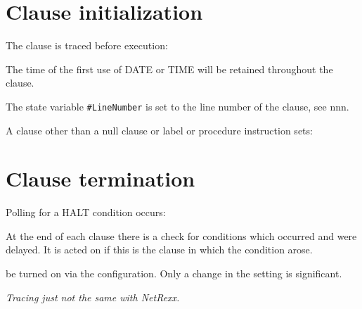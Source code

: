 

\section{Clause initialization}\label{clause-initialization}

The clause is traced before execution:



The time of the first use of DATE or TIME will be retained throughout
the clause.



The state variable \texttt{\#LineNumber} is set to the line number of
the clause, see nnn.

A clause other than a null clause or label or procedure instruction
sets:



\section{Clause termination}\label{clause-termination}



Polling for a HALT condition occurs:



At the end of each clause there is a check for conditions which occurred
and were delayed. It is acted on if this is the clause in which the
condition arose.


be turned on via the configuration. Only a change in the setting is
significant.



\emph{Tracing just not the same with NetRexx.}

